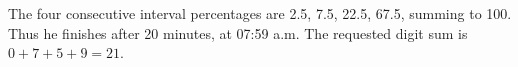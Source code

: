 The four consecutive interval percentages are 2.5, 7.5, 22.5, 67.5, summing to 100. Thus he finishes after 20 minutes, at 07:59 a.m. The requested digit sum is $0+7+5+9=\boxed{21}$.
